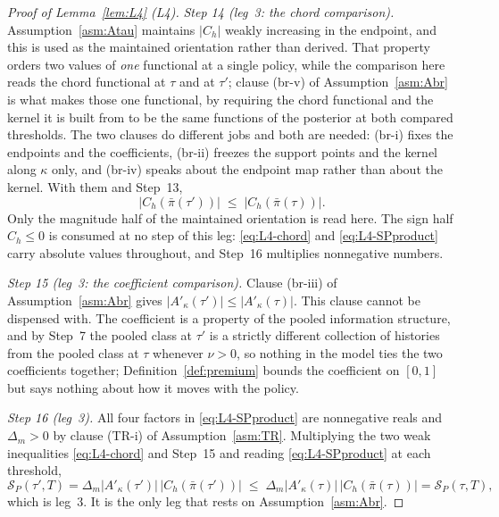 \documentclass[11pt]{article}
\newcommand{\Akap}{A'_{\kappa}}
\begin{document}
\begin{proof}[Proof of Lemma~\ref{lem:L4} (L4)]
\emph{Step 14 (leg~3: the chord comparison).} Assumption~\ref{asm:Atau} maintains
$\lvert C_h\rvert$ weakly increasing in the endpoint, and this is used as the maintained orientation
rather than derived. That property orders two values of \emph{one} functional at a single policy,
while the comparison here reads the chord functional at $\tau$ and at $\tau'$; clause (br-v) of
Assumption~\ref{asm:Abr} is what makes those one functional, by requiring the chord functional and
the kernel it is built from to be the same functions of the posterior at both compared thresholds.
The two clauses do different jobs and both are needed: (br-i) fixes the endpoints and the
coefficients, (br-ii) freezes the support points and the kernel along $\kappa$ only, and (br-iv)
speaks about the endpoint map rather than about the kernel. With them and Step~13,
\begin{equation}
\label{eq:L4-chord}
\lvert C_h(\bar\pi(\tau'))\rvert \;\le\; \lvert C_h(\bar\pi(\tau))\rvert .
\end{equation}
Only the magnitude half of the maintained orientation is read here. The sign half $C_h \le 0$ is
consumed at no step of this leg: \eqref{eq:L4-chord} and \eqref{eq:L4-SPproduct} carry absolute
values throughout, and Step~16 multiplies nonnegative numbers.

\emph{Step 15 (leg~3: the coefficient comparison).} Clause (br-iii) of Assumption~\ref{asm:Abr} gives
$\lvert\Akap(\tau')\rvert \le \lvert\Akap(\tau)\rvert$. This clause cannot be dispensed with. The
coefficient is a property of the pooled information structure, and by Step~7 the pooled class at
$\tau'$ is a strictly different collection of histories from the pooled class at $\tau$ whenever
$\nu > 0$, so nothing in the model ties the two coefficients together; Definition~\ref{def:premium}
bounds the coefficient on $[0,1]$ but says nothing about how it moves with the policy.

\emph{Step 16 (leg~3).} All four factors in \eqref{eq:L4-SPproduct} are nonnegative reals and
$\Delta_m > 0$ by clause (TR-i) of Assumption~\ref{asm:TR}. Multiplying the two weak inequalities
\eqref{eq:L4-chord} and Step~15 and reading \eqref{eq:L4-SPproduct} at each threshold,
\begin{equation}
\label{eq:L4-leg3}
\mathcal S_P(\tau',T)
 = \Delta_m\lvert\Akap(\tau')\rvert\,\lvert C_h(\bar\pi(\tau'))\rvert
 \;\le\; \Delta_m\lvert\Akap(\tau)\rvert\,\lvert C_h(\bar\pi(\tau))\rvert
 = \mathcal S_P(\tau,T),
\end{equation}
which is leg~3. It is the only leg that rests on Assumption~\ref{asm:Abr}.


\end{proof}
\end{document}
